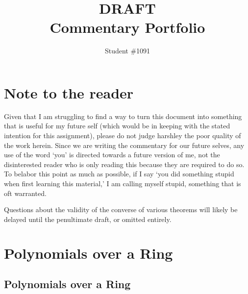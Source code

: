 \documentclass[letterpaper, 12pt]{article}
\begin{document}
	\title{\color{red} DRAFT \color{black} \\ Commentary Portfolio} %
	\author{Student \#1091}

	\maketitle

	\tableofcontents
	\newpage

	\section*{Note to the reader}
	\label{sec:note_to_the_reader}
	Given that I am struggling to find a way to turn this document into something that is useful for my future self (which would be in keeping with the stated intention for this assignment), please do not judge harshley the poor quality of the work herein.
	Since we are writing the commentary for our future selves, any use of the word `you' is directed towards a future version of me, not the disinterested reader who is only reading this because they are required to do so.
	To belabor this point as much as possible, if I say `you did something stupid when first learning this material,' I am calling myself stupid, something that is oft warranted.

	Questions about the validity of the converse of various theorems will likely be delayed until the penultimate draft, or omitted entirely.

	\setcounter{page}{2}

	\newpage
	
	\setcounter{section}{6}
	\section{Polynomials over a Ring}
	\label{sec:polynomials_over_a_ring}
		\subsection{Polynomials over a Ring}
		\label{sub:polynomials_over_a_ring}
\end{document}

